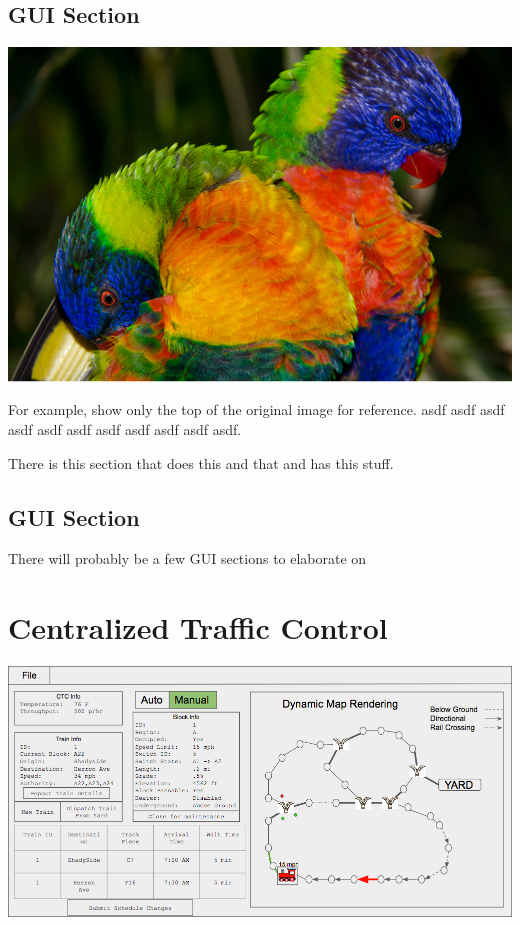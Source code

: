 \documentclass{scrreprt}
\begin{document}
\section{GUI Section}

\includegraphics[trim={0 10cm 0 0},clip,width=\textwidth]{sample}

For example, show only the top of the original image for reference. asdf asdf asdf
asdf asdf asdf asdf asdf asdf asdf asdf.

There is this section that does this and that and has this stuff.

\section{GUI Section}
There will probably be a few GUI sections to elaborate on


\chapter{Centralized Traffic Control}

\includegraphics[width=\textwidth]{CTC-main}
\end{document}
